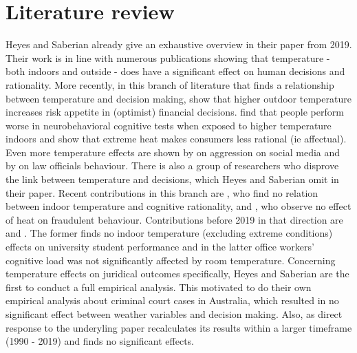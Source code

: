 \documentclass[11pt]{article}
\begin{document}
	\section{Literature review}
	Heyes and Saberian already give an exhaustive overview in their paper from 2019. Their work is in line with numerous publications showing that temperature - both indoors and outside - does have a significant effect on human decisions and rationality. More recently, in this branch of literature that finds a relationship between temperature and decision making, \cite{Gavresi.2021} show that higher outdoor temperature increases risk appetite in (optimist) financial decisions. \cite{Chen.2020} find that people perform worse in neurobehavioral cognitive tests when exposed to higher temperature indoors and  \cite{Hadi.2019} show that extreme heat makes consumers less rational (ie affectual). Even more temperature effects are shown by \cite{Stevens.2021} on aggression on social media and by \cite{Ryan.2020} on law officials behaviour. 
	\newline There is also a group of researchers who disprove the link between temperature and decisions, which Heyes and Saberian omit in their paper. Recent contributions in this branch are \cite{Stroom.2021}, who find no relation between indoor temperature and cognitive rationality, and \cite{Liu.2020}, who observe no effect of heat on fraudulent behaviour. Contributions before 2019 in that direction are \cite{zhang2017university} and \cite{ZHANG2017176}. The former finds no indoor temperature (excluding extreme conditions) effects on university student performance and in the latter office workers' cognitive load was not significantly affected by room temperature.
	\newline Concerning temperature effects on juridical outcomes specifically, Heyes and Saberian are the first to conduct a full empirical analysis. This motivated  \cite{Evans.2021} to do their own empirical analysis about criminal court cases in Australia, which resulted in no significant effect between weather variables and decision making. Also, as direct response to the underyling paper \cite{Spamann.2020} recalculates its results within a larger timeframe (1990 - 2019) and finds no significant effects.
	
\end{document}

